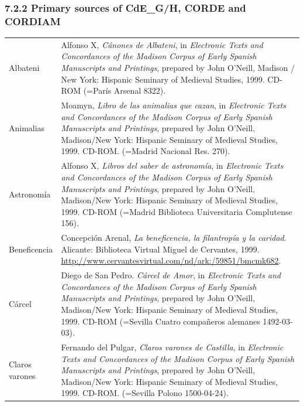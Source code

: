 \subsubsection[7.2.2 Primary sources of CdE\_G/H, CORDE and CORDIAM]{7.2.2 Primary sources of CdE\_G/H, CORDE and CORDIAM}
\begin{flushleft}
\tablefirsthead{}
\tablehead{}
\tabletail{}
\tablelasttail{}
\begin{supertabular}{m{1.7955599in}m{4.42126in}}
Albateni  &
Alfonso X, \textit{Cánones de Albateni}, in \textit{Electronic Texts and Concordances of the Madison Corpus of Early Spanish Manuscripts and Printings},\textit{ }prepared by John O’Neill, Madison / New York: Hispanic Seminary of Medieval Studies, 1999. CD-ROM (=París Arsenal 8322).\\
Animalias  &
Moamyn,\textit{ Libro de las animalias que cazan}, in \textit{Electronic Texts and Concordances of the Madison Corpus of Early Spanish Manuscripts and Printings},\textit{ }prepared by John O’Neill, Madison/New York: Hispanic Seminary of Medieval Studies, 1999. CD-ROM.\textit{ }(=Madrid Nacional Res. 270). \\
Astronomía  &
Alfonso X, \textit{Libros del saber de astronomía}, in \textit{Electronic Texts and Concordances of the Madison Corpus of Early Spanish Manuscripts and Printings},\textit{ }prepared by John O’Neill, Madison/New York: Hispanic Seminary of Medieval Studies, 1999. CD-ROM (=Madrid Biblioteca Universitaria Complutense 156)\textit{.}\\
Beneficencia  &
Concepción Arenal,\textit{ La beneficencia, la filantropía y la caridad}. Alicante: Biblioteca Virtual Miguel de Cervantes, 1999. \url{http://www.cervantesvirtual.com/nd/ark:/59851/bmcmk682}. \\
Cárcel\textit{ } &
Diego de San Pedro.\textit{ Cárcel de Amor}, in \textit{Electronic Texts and Concordances of the Madison Corpus of Early Spanish Manuscripts and Printings},\textit{ }prepared by John O’Neill, Madison/New York: Hispanic Seminary of Medieval Studies, 1999. CD-ROM (=Sevilla Cuatro compañeros alemanes 1492-03-03)\textit{.}\\
Claros varones\textit{ } &
Fernando del Pulgar, \textit{Claros varones de Castilla},\textit{ }in \textit{Electronic Texts and Concordances of the Madison Corpus of Early Spanish Manuscripts and Printings},\textit{ }prepared by John O’Neill, Madison/New York: Hispanic Seminary of Medieval Studies, 1999. CD-ROM. (=Sevilla Polono 1500-04-24)\textit{.}\\

\end{supertabular}
\end{flushleft}
